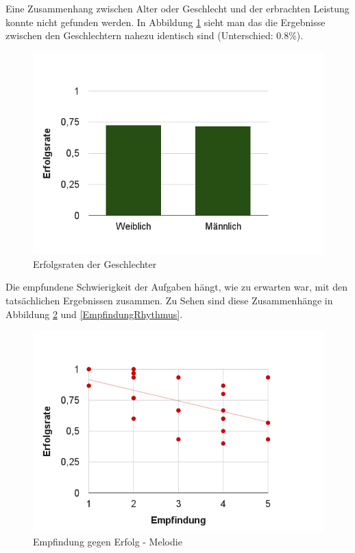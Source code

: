 \documentclass{acm_proc_article-sp}
\begin{document}
Eine Zusammenhang zwischen Alter oder Geschlecht und der erbrachten Leistung konnte nicht gefunden werden. In Abbildung \ref{Geschlechter} sieht man das die Ergebnisse zwischen den Geschlechtern nahezu identisch sind (Unterschied: 0.8\%). \\
\begin{figure}[H]
\includegraphics[width=1.0\linewidth]{Abbildungen/Geschlecht-Erfolg.png}
\caption{Erfolgsraten der Geschlechter}
\label{Geschlechter}
\end{figure}
Die empfundene Schwierigkeit der Aufgaben hängt, wie zu erwarten war,  mit den tatsächlichen Ergebnissen zusammen. Zu Sehen sind diese Zusammenhänge in Abbildung \ref{EmpfindungMelodie} und \ref{EmpfindungRhythmus}.
\begin{figure}[H]
\includegraphics[width=1.0\linewidth]{Abbildungen/Empfindung-Erfolg_Melodie.png}
\caption{Empfindung gegen Erfolg - Melodie}
\label{EmpfindungMelodie}
\end{figure}
\end{document}
